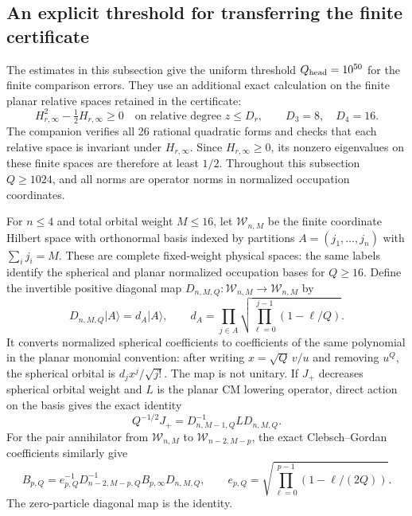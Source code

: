 \documentclass[11pt]{article}
\begin{document}
\subsection{An explicit threshold for transferring the finite certificate}
\label{sec:explicit-head}

The estimates in this subsection give the uniform threshold
$Q_{\rm head}=10^{50}$ for the finite comparison errors.
They use an additional exact calculation on the finite planar
relative spaces retained in the certificate:
\begin{equation}\label{eq:planar-head-half-gap}
 H_{r,\infty}^2-\tfrac12H_{r,\infty}\ge0
 \quad\text{on relative degree }z\le D_r,
 \qquad D_3=8,\quad D_4=16.
\end{equation}
The companion  verifies all 26 rational
quadratic forms and checks that each relative space is invariant under
$H_{r,\infty}$. Since $H_{r,\infty}\ge0$, its nonzero eigenvalues on
these finite spaces are therefore at least $1/2$. 
Throughout this subsection $Q\ge1024$, and all norms are operator norms
in normalized occupation coordinates.

For $n\le4$ and total orbital weight $M\le16$, let $\mathcal W_{n,M}$
be the finite coordinate Hilbert space with orthonormal basis indexed by
partitions $A=(j_1,\ldots,j_n)$ with $\sum_i j_i=M$. These are complete
fixed-weight physical spaces: the same labels identify the spherical and
planar normalized occupation bases for $Q\ge16$. Define the invertible
positive diagonal map $D_{n,M,Q}:\mathcal W_{n,M}\to\mathcal W_{n,M}$ by
\begin{equation}\label{eq:head-diagonal-map}
 D_{n,M,Q}|A\rangle=d_A|A\rangle,
 \qquad d_A=\prod_{j\in A}\sqrt{\prod_{\ell=0}^{j-1}(1-\ell/Q)}.
\end{equation}
It converts normalized spherical coefficients to coefficients of the same
polynomial in the planar monomial convention: after writing
$x=\sqrt Q\,v/u$ and removing $u^Q$, the spherical orbital is
$d_jx^j/\sqrt{j!}$. The map is not unitary. If $J_+$ decreases spherical
orbital weight and $L$ is the planar CM lowering operator, direct action
on the basis gives the exact identity
\begin{equation}\label{eq:head-raising-conjugacy}
 Q^{-1/2}J_+=D_{n,M-1,Q}^{-1}L D_{n,M,Q}.
\end{equation}
For the pair annihilator from $\mathcal W_{n,M}$ to
$\mathcal W_{n-2,M-p}$, the exact Clebsch--Gordan coefficients similarly
give
\begin{equation}\label{eq:head-pair-conjugacy}
 B_{p,Q}=e_{p,Q}^{-1}D_{n-2,M-p,Q}^{-1}
 B_{p,\infty}D_{n,M,Q},\qquad
 e_{p,Q}=\sqrt{\prod_{\ell=0}^{p-1}(1-\ell/(2Q))}.
\end{equation}
The zero-particle diagonal map is the identity.
\end{document}
